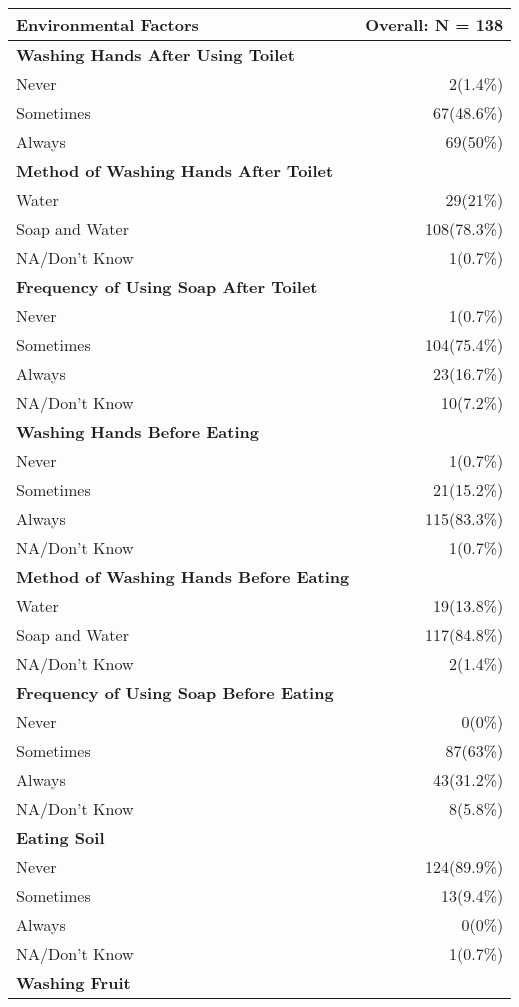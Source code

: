 \documentclass[4pt,letterpaper]{article}
\begin{document}
\begin{multicols}{2}
\begin{center}
\begin{tabular}{p{5cm}r}
\toprule
\textbf{Environmental Factors} & \textbf{Overall: N = 138} \\
\midrule
\textbf{Washing Hands After Using Toilet} & \\
Never & 2(1.4\%) \\
Sometimes & 67(48.6\%) \\
Always & 69(50\%) \\
\midrule
\textbf{Method of Washing Hands After Toilet} & \\
Water & 29(21\%) \\
Soap and Water & 108(78.3\%) \\
NA/Don't Know & 1(0.7\%) \\
\midrule
\textbf{Frequency of Using Soap After Toilet} & \\
Never & 1(0.7\%) \\
Sometimes & 104(75.4\%) \\
Always & 23(16.7\%) \\
NA/Don't Know & 10(7.2\%) \\
\midrule
\textbf{Washing Hands Before Eating} & \\
Never & 1(0.7\%) \\
Sometimes & 21(15.2\%) \\
Always & 115(83.3\%) \\
NA/Don't Know & 1(0.7\%) \\
\midrule
\textbf{Method of Washing Hands Before Eating} & \\
Water & 19(13.8\%) \\
Soap and Water & 117(84.8\%) \\
NA/Don't Know & 2(1.4\%) \\
\midrule
\textbf{Frequency of Using Soap Before Eating} & \\
Never & 0(0\%) \\
Sometimes & 87(63\%) \\
Always & 43(31.2\%) \\
NA/Don't Know & 8(5.8\%) \\
\midrule
\textbf{Eating Soil} & \\
Never & 124(89.9\%) \\
Sometimes & 13(9.4\%) \\
Always & 0(0\%) \\
NA/Don't Know & 1(0.7\%) \\
\midrule
\textbf{Washing Fruit} & \\

\end{tabular}
\end{center}
\end{multicols}
\end{document}
